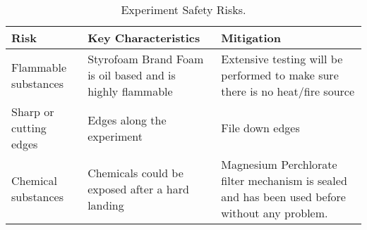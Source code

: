 \begin{table}[H]
\centering

\begin{tabular}{|m{}|m{}|m{}|}
\hline
\textbf{Risk}          & \textbf{Key Characteristics}                              & \textbf{Mitigation}                                                           \\ \hline
Flammable substances    & Styrofoam Brand Foam is oil based and is highly flammable & Extensive testing will be performed to make sure there is no heat/fire source \\ \hline
Sharp or cutting edges & Edges along the experiment                                & File down edges                                                               \\ \hline
Chemical substances & Chemicals could be exposed after a hard landing & Magnesium Perchlorate filter mechanism is sealed and has been used before without any problem. \\ \hline
\end{tabular}
\caption{Experiment Safety Risks.}
\label{tab:safrisk}
\end{table}
\raggedbottom